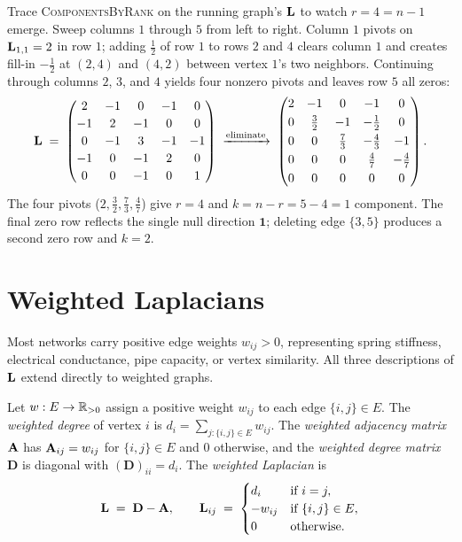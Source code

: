 \begin{labbox}
Trace \textsc{ComponentsByRank} on the running graph's $\mathbf{L}$ to watch $r = 4 = n-1$ emerge. Sweep columns $1$ through $5$ from left to right. Column $1$ pivots on $\mathbf{L}_{1,1} = 2$ in row $1$; adding $\tfrac12$ of row $1$ to rows $2$ and $4$ clears column $1$ and creates fill-in $-\tfrac12$ at $(2,4)$ and $(4,2)$ between vertex $1$'s two neighbors. Continuing through columns $2$, $3$, and $4$ yields four nonzero pivots and leaves row $5$ all zeros:
\[
  \mathbf{L} \;=\;
  \begin{pmatrix}
     2 & -1 &  0 & -1 &  0\\[2pt]
    -1 &  2 & -1 &  0 &  0\\[2pt]
     0 & -1 &  3 & -1 & -1\\[2pt]
    -1 &  0 & -1 &  2 &  0\\[2pt]
     0 &  0 & -1 &  0 &  1
  \end{pmatrix}
  \;\xrightarrow{\text{eliminate}}\;
  \begin{pmatrix}
    2 & -1 & 0 & -1 & 0\\[3pt]
    0 & \tfrac32 & -1 & -\tfrac12 & 0\\[3pt]
    0 & 0 & \tfrac73 & -\tfrac43 & -1\\[3pt]
    0 & 0 & 0 & \tfrac47 & -\tfrac47\\[3pt]
    0 & 0 & 0 & 0 & 0
  \end{pmatrix}.
\]
The four pivots ($2,\tfrac32,\tfrac73,\tfrac47$) give $r=4$ and $k = n-r = 5-4 = 1$ component. The final zero row reflects the single null direction $\mathbf{1}$; deleting edge $\{3,5\}$ produces a second zero row and $k=2$.
\end{labbox}

\section{Weighted Laplacians}\label{ch31:weighted}

Most networks carry positive edge weights $w_{ij} > 0$, representing spring stiffness, electrical conductance, pipe capacity, or vertex similarity. All three descriptions of $\mathbf{L}$ extend directly to weighted graphs.

\begin{definition}\label{ch31:def-weighted}
Let $w:E\to\mathbb{R}_{>0}$ assign a positive weight $w_{ij}$ to each edge $\{i,j\}\in E$. The \emph{weighted degree} of vertex $i$ is $d_i = \sum_{j:\{i,j\}\in E} w_{ij}$. The \emph{weighted adjacency matrix} $\mathbf{A}$ has $\mathbf{A}_{ij} = w_{ij}$ for $\{i,j\}\in E$ and $0$ otherwise, and the \emph{weighted degree matrix} $\mathbf{D}$ is diagonal with $(\mathbf{D})_{ii} = d_i$. The \emph{weighted Laplacian} is
\[
  \mathbf{L} \;=\; \mathbf{D} - \mathbf{A},
  \qquad
  \mathbf{L}_{ij} \;=\;
  \begin{cases}
    d_i & \text{if } i=j,\\
    -w_{ij} & \text{if } \{i,j\}\in E,\\
    0 & \text{otherwise.}
  \end{cases}
\]
\end{definition}

